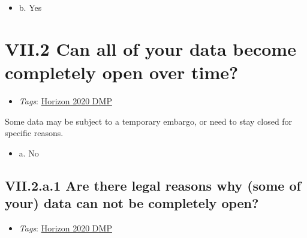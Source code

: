 \documentclass[a4paper,12pt]{report}
\begin{document}
\begin{itemize}
  \item[\CheckmarkBold] b. Yes
\end{itemize}






\section*{\protect\textcolor{colorSecId}{VII.2} Can all of your data become completely open over time?}

\label{6be88f7c-f868-460f-bba7-91e1c659adfd.a549d10b-aa46-4c0c-863f-30219ac5ecce}


\begin{itemize}
  \item \textit{Tags}: \ul{Horizon 2020 DMP}
  \end{itemize}


\noindent
\begin{markdown}
Some data may be subject to a temporary embargo, or need to stay closed for specific reasons. 
\end{markdown}



\begin{itemize}
  \item[\CheckmarkBold] a. No
\end{itemize}




\subsection*{\protect\textcolor{colorSecId}{VII.2.a.1} Are there legal reasons why (some of your) data can not be completely open?}

\label{6be88f7c-f868-460f-bba7-91e1c659adfd.a549d10b-aa46-4c0c-863f-30219ac5ecce.b3739ebd-2d8e-42d3-9425-a7d6d1b26c79.c010e830-bd89-460d-9498-cb41e7ffeb87}


\begin{itemize}
  \item \textit{Tags}: \ul{Horizon 2020 DMP}
  \end{itemize}
\end{document}
